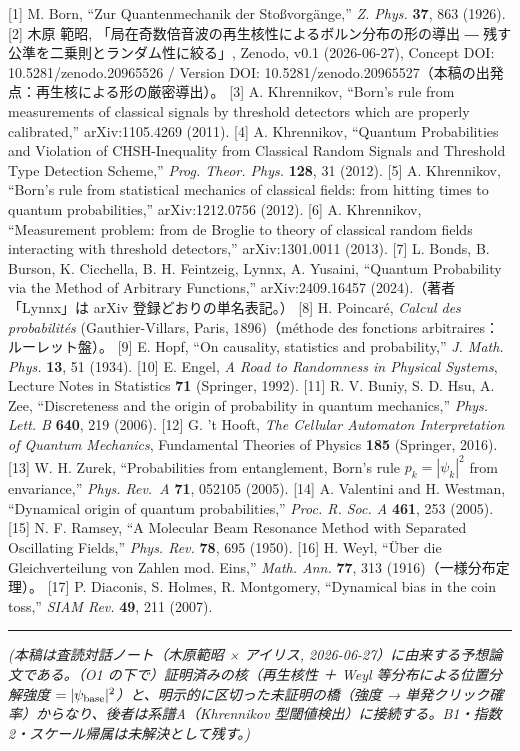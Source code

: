\documentclass[
]{ltjsarticle}
\begin{document}
{[}1{]} M. Born, ``Zur Quantenmechanik der Stoßvorgänge,'' \emph{Z.
Phys.} \textbf{37}, 863 (1926). {[}2{]} 木原 範昭,
「局在奇数倍音波の再生核性によるボルン分布の形の導出 ―
残す公準を二乗則とランダム性に絞る」, Zenodo, v0.1 (2026-06-27), Concept
DOI: 10.5281/zenodo.20965526 / Version DOI:
10.5281/zenodo.20965527（本稿の出発点：再生核による形の厳密導出）。
{[}3{]} A. Khrennikov, ``Born's rule from measurements of classical
signals by threshold detectors which are properly calibrated,''
arXiv:1105.4269 (2011). {[}4{]} A. Khrennikov, ``Quantum Probabilities
and Violation of CHSH-Inequality from Classical Random Signals and
Threshold Type Detection Scheme,'' \emph{Prog. Theor. Phys.}
\textbf{128}, 31 (2012). {[}5{]} A. Khrennikov, ``Born's rule from
statistical mechanics of classical fields: from hitting times to quantum
probabilities,'' arXiv:1212.0756 (2012). {[}6{]} A. Khrennikov,
``Measurement problem: from de Broglie to theory of classical random
fields interacting with threshold detectors,'' arXiv:1301.0011 (2013).
{[}7{]} L. Bonds, B. Burson, K. Cicchella, B. H. Feintzeig, Lynnx, A.
Yusaini, ``Quantum Probability via the Method of Arbitrary Functions,''
arXiv:2409.16457 (2024).（著者「Lynnx」は arXiv 登録どおりの単名表記。）
{[}8{]} H. Poincaré, \emph{Calcul des probabilités} (Gauthier-Villars,
Paris, 1896)（méthode des fonctions arbitraires：ルーレット盤）。
{[}9{]} E. Hopf, ``On causality, statistics and probability,'' \emph{J.
Math. Phys.} \textbf{13}, 51 (1934). {[}10{]} E. Engel, \emph{A Road to
Randomness in Physical Systems}, Lecture Notes in Statistics \textbf{71}
(Springer, 1992). {[}11{]} R. V. Buniy, S. D. Hsu, A. Zee,
``Discreteness and the origin of probability in quantum mechanics,''
\emph{Phys. Lett. B} \textbf{640}, 219 (2006). {[}12{]} G. 't Hooft,
\emph{The Cellular Automaton Interpretation of Quantum Mechanics},
Fundamental Theories of Physics \textbf{185} (Springer, 2016). {[}13{]}
W. H. Zurek, ``Probabilities from entanglement, Born's rule
\(p_k=|\psi_k|^2\) from envariance,'' \emph{Phys. Rev.~A} \textbf{71},
052105 (2005). {[}14{]} A. Valentini and H. Westman, ``Dynamical origin
of quantum probabilities,'' \emph{Proc. R. Soc. A} \textbf{461}, 253
(2005). {[}15{]} N. F. Ramsey, ``A Molecular Beam Resonance Method with
Separated Oscillating Fields,'' \emph{Phys. Rev.} \textbf{78}, 695
(1950). {[}16{]} H. Weyl, ``Über die Gleichverteilung von Zahlen mod.
Eins,'' \emph{Math. Ann.} \textbf{77}, 313 (1916)（一様分布定理）。
{[}17{]} P. Diaconis, S. Holmes, R. Montgomery, ``Dynamical bias in the
coin toss,'' \emph{SIAM Rev.} \textbf{49}, 211 (2007).

\begin{center}\rule{0.5\linewidth}{0.5pt}\end{center}

\emph{(本稿は査読対話ノート（木原範昭 × アイリス,
2026-06-27）に由来する予想論文である。（O1
の下で）証明済みの核（再生核性 ＋ Weyl 等分布による位置分解強度
\(=|\psi_{\rm base}|^2\)）と、明示的に区切った未証明の橋（強度 →
単発クリック確率）からなり、後者は系譜A（Khrennikov
型閾値検出）に接続する。B1・指数2・スケール帰属は未解決として残す。)}
\end{document}
